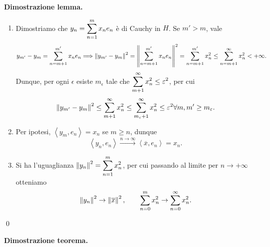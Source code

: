 \documentclass[a4paper, 12pt]{report}
\begin{document}
\textbf{Dimostrazione lemma.} 
\begin{enumerate}
\item Dimostriamo che $\displaystyle y_n = \sum_{n = 1}^{m} x_n e_n$ è di Cauchy in $H$.
Se $m' > m$, vale
%
$$
y_{m'} - y_m = \sum_{n = m+1}^{m'} x_n e_n
\Longrightarrow  \left\lVert y_{m'} - y_m \right\rVert^2 = \left\lVert \sum_{n = m+1}^{m'} x_n e_n \right\rVert^2 
= \sum_{n = m+1}^{m'} x_n^2 \leq \sum_{n = m+1}^{\infty} x_n^2 < +\infty.
$$
%
Dunque, per ogni $\epsilon$ esiste $m_\epsilon$ tale che $\displaystyle \sum_{m + 1}^{\infty} x_n^2 \leq \varepsilon^2 $, per cui 
%
$$
\left\lVert y_{m'} - y_m \right\rVert^2 \leq \sum_{m+1}^{\infty} x_n^2 \leq \sum_{m_\varepsilon + 1}^{\infty} x_n^2 \leq \varepsilon^2 \forall m,m' \geq m_\varepsilon.
$$
%

\item Per ipotesi, $\left<y_m, e_n \right> = x_n$ se $m \geq n$, dunque
%
$$
\left<y_n, e_n \right> \xrightarrow{n \to \infty} \left<\overline{x},e_n \right> = x_n.
$$
%

\item Si ha l'uguaglianza $\displaystyle \left\lVert y_n \right\rVert^2 = \sum_{n=1}^{m} x_n^2$, per cui passando al limite per $n \to +\infty$ otteniamo 
%
$$
\left\lVert y_n \right\rVert^2 \to \left\lVert \overline{x} \right\rVert^2, \qquad \sum_{n=0}^{m} x_n^2 \to \sum_{n=0}^{\infty} x_n^2.
$$
%


\end{enumerate}
\qed


\textbf{Dimostrazione teorema.}
\end{document}
